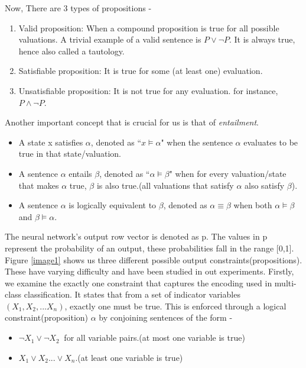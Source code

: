 \documentclass[12pt]{article}
\begin{document}
Now, There are 3 types of propositions - 
\begin{enumerate}
    \item Valid proposition: When a compound proposition is true for all possible valuations. A trivial example of a valid sentence is $P \vee\neg P$. It is always true, hence also called a tautology.
    \item Satisfiable proposition: It is true for some (at least one) evaluation.
    \item Unsatisfiable proposition: It is not true for any evaluation. for instance, $P \wedge\neg P$.
\end{enumerate}

Another important concept that is crucial for us is that of \textit{entailment}. 
\begin{itemize}
    \item A state x satisfies $\alpha$, denoted as ``$x\models\alpha$" when the sentence  $\alpha$ evaluates to be true in that state/valuation.
    \item A sentence $\alpha$ entails $\beta$, denoted as ``$\alpha\models\beta$" when for every valuation/state that makes $\alpha$ true, $\beta$ is also true.(all valuations that satisfy $\alpha$ also satisfy $\beta$). 
    \item A sentence $\alpha$ is logically equivalent to $\beta$, denoted as $\alpha\equiv\beta$ when both $\alpha\models\beta$ and $\beta\models\alpha$.
\end{itemize}
The neural network's output row vector is denoted as p. The values in p represent the probability of an output, these probabilities fall in the range [0,1]. 
Figure \ref{image1} shows us three different possible output constraints(propositions). These have varying difficulty and have been studied in out experiments. 
Firstly, we examine the exactly one constraint that captures the encoding used in multi-class classification. It states that from a set of indicator variables $(X_1, X_2, ...X_n)$, exactly one must be true. 
This is enforced through a logical constraint(proposition) $\alpha$ by conjoining sentences of the form - 
\begin{itemize}
    \item $\neg X_1 \vee \neg X_2\ $ for all variable pairs.(at most one variable is true)
    \item $X_1\vee X_2...\vee X_n$.(at least one variable is true)
\end{itemize}
\end{document}
